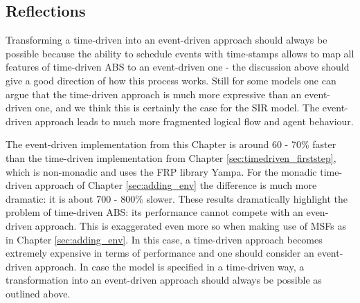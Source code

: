 \subsection{Reflections}
Transforming a time-driven into an event-driven approach should always be possible because the ability to schedule events with time-stamps allows to map all features of time-driven ABS to an event-driven one - the discussion above should give a good direction of how this process works. Still for some models one can argue that the time-driven approach is much more expressive than an event-driven one, and we think this is certainly the case for the SIR model. The event-driven approach leads to much more fragmented logical flow and agent behaviour.

The event-driven implementation from this Chapter is around 60 - 70\% faster than the time-driven implementation from Chapter \ref{sec:timedriven_firststep}, which is non-monadic and uses the FRP library Yampa. For the monadic time-driven approach of Chapter \ref{sec:adding_env} the difference is much more dramatic: it is about 700 - 800\% slower. These results dramatically highlight the problem of time-driven ABS: its performance cannot compete with an even-driven approach. This is exaggerated even more so when making use of MSFs as in Chapter \ref{sec:adding_env}. In this case, a time-driven approach becomes extremely expensive in terms of performance and one should consider an event-driven approach. In case the model is specified in a time-driven way, a transformation into an event-driven approach should always be possible as outlined above.